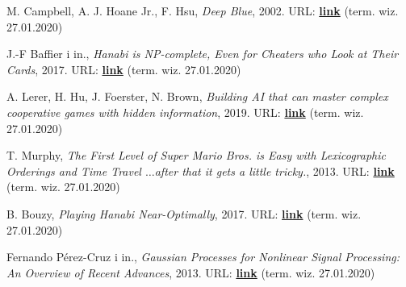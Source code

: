 \documentclass[declaration,shortabstract,inz]{iithesis}
\begin{document}
\begin{thebibliography}{4}

 M. Campbell, A. J. Hoane Jr., F. Hsu, \textit{Deep Blue}, 2002. URL: 
\href{https://core.ac.uk/download/pdf/82416379.pdf}{\textbf{link}} (term. wiz. 27.01.2020)

 J.-F Baffier i in., \textit{Hanabi is NP-complete, Even for Cheaters who Look at Their Cards}, 2017. URL: 
\href{https://arxiv.org/pdf/1603.01911.pdf}{\textbf{link}} (term. wiz. 27.01.2020)

 A. Lerer, H. Hu, J. Foerster, N. Brown, \textit{Building AI that can master complex cooperative games with hidden information}, 2019. URL: 
\href{https://ai.facebook.com/blog/building-ai-that-can-master-complex-cooperative-games-with-hidden-information/}{\textbf{link}} (term. wiz. 27.01.2020)

 T. Murphy, \textit{The First Level of Super Mario Bros. is Easy with Lexicographic Orderings and Time Travel $\ldots$after that it gets a little tricky.}, 2013. URL: 
\href{http://www.cs.cmu.edu/~tom7/mario/mario.pdf}{\textbf{link}} (term. wiz. 27.01.2020)

 B. Bouzy, \textit{Playing Hanabi Near-Optimally}, 2017. URL: 
\href{http://helios.mi.parisdescartes.fr/~bouzy/publications/bouzy-hanabi-2017.pdf}{\textbf{link}} (term. wiz. 27.01.2020)

 Fernando Pérez-Cruz i in., \textit{Gaussian Processes for Nonlinear Signal Processing: An Overview of Recent Advances}, 2013. URL: 
\href{https://www.researchgate.net/publication/260637079_Gaussian_Processes_for_Nonlinear_Signal_Processing_An_Overview_of_Recent_Advances}{\textbf{link}} (term. wiz. 27.01.2020)

\end{thebibliography}
\end{document}
